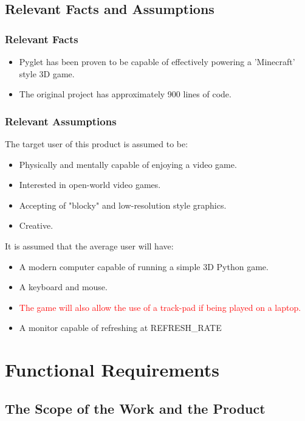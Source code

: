 \documentclass[12pt, titlepage]{article}
\begin{document}
\subsection{Relevant Facts and Assumptions}

\subsubsection{Relevant Facts}

\begin{itemize}
    \item Pyglet has been proven to be capable of effectively powering a 'Minecraft' style 3D game.
    \item The original project has approximately 900 lines of code.
\end{itemize}

\subsubsection{Relevant Assumptions}

The target user of this product is assumed to be:
\begin{itemize}
    \item Physically and mentally capable of enjoying a video game.
    \item Interested in open-world video games.
    \item Accepting of "blocky" and low-resolution style graphics.
    \item Creative.
\end{itemize}

It is assumed that the average user will have:
\begin{itemize}
    \item A modern computer capable of running a simple 3D Python game.
    \item A keyboard and mouse.
    \item \textcolor{red}{The game will also allow the use of a track-pad if being played on a laptop.}
    \item A monitor capable of refreshing at REFRESH\_RATE
\end{itemize}

\section{Functional Requirements}

\subsection{The Scope of the Work and the Product}
\end{document}
